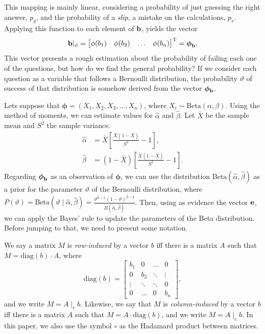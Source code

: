 \documentclass{article}
\newcommand{\0}{\mathbbold{0}}
\newcommand{\1}{\mathds{1}}
\newcommand{\2}{\mathbbold{2}}
\newcommand{\T}{^{\operatorname{T}}}
\newcommand{\diag}[1]{\text{diag}\!\left(#1\right)}
\newcommand{\Beta}[2]{\text{Beta}\!\left(#1,#2\right)}
\begin{document}
This mapping is mainly linear, considering a probability of just guessing the right answer, $p_g$, and the probability of a \textsl{slip}, a mistake on the calculations, $p_s$.
Applying this function to each element of ${\bf b}$, yields the vector
$$ {\bf b}|_\phi = \begin{bmatrix}
    \phi(b_1) & \phi(b_2) & \hdots & \phi(b_n)
\end{bmatrix}\T = {\boldsymbol \phi}_{\bf b}. $$
This vector presents a rough estimation about the probability of failing each one of the questions, but how do we find the general probability?
If we consider each question as a variable that follows a Bernoulli distribution, the probability $\vartheta$ of success of that distribution is somehow derived from the vector ${\boldsymbol \phi}_{\bf b}$.

Lets suppose that ${\boldsymbol \phi} = \left(X_1, X_2, X_3, \dots, X_n\right)$, where $X_i \sim \Beta{\alpha}{\beta}$. Using the method of moments, we can estimate values for $\hat{\alpha}$ and $\hat{\beta}$.
Let $\bar{X}$ be the sample mean and $S^2$ the sample variance.
\begin{align*}
    \hat{\alpha} &= \bar{X}\left[\frac{\bar{X}(1-\bar{X})}{S^2} - 1\right], \\
    \hat{\beta} &= (1 - \bar{X})\left[\frac{\bar{X}(1-\bar{X})}{S^2} - 1\right].
\end{align*}
Regarding ${\boldsymbol \phi}_{\bf b}$ as an observation of ${\boldsymbol \phi}$, we can use the distribution $\Beta{\hat{\alpha}}{\hat{\beta}}$ as a prior for the parameter $\vartheta$ of the Bernoulli distribution,
where $P(\vartheta) = \Beta{\vartheta \mid \hat{\alpha}}{\hat{\beta}} = \frac{\vartheta^{\hat{\alpha} - 1}(1 - \vartheta)^{\hat{\beta} - 1}}{B\left(\hat{\alpha},\hat{\beta}\right)}$.
Then, using as evidence the vector ${\bf e}$, we can apply the Bayes' rule to update the parameters of the Beta distribution.
Before jumping to that, we need to present some notation.

We say a matrix $M$ is \textsl{row-induced} by a vector $b$ iff there is a matrix $A$ such that $M = \diag{b}\cdot A$, where
$$ \diag{b} = \begin{bmatrix}
    b_1 & 0 & \hdots & 0 \\
    0 & b_2 & \ddots & \vdots \\
    \vdots & \ddots & \ddots & 0 \\
    0 & \hdots & 0 & b_n
\end{bmatrix}, $$ and we write $M = A \mid_r b$.
Likewise, we say that $M$ is \textsl{column-induced} by a vector $b$ iff there is a matrix $A$ such that $M = A\cdot\diag{b}$, and we write $M = A \mid_c b$.
In this paper, we also use the symbol $\circ$ as the Hadamard product between matrices.
\end{document}
